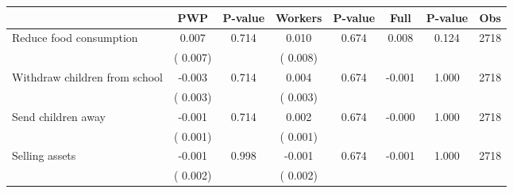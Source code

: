 
\begin{tabular}{l*{7}{c}}\hline&\multicolumn{1}{c}{PWP}&\multicolumn{1}{c}{P-value}&\multicolumn{1}{c}{Workers}&\multicolumn{1}{c}{P-value}&\multicolumn{1}{c}{Full}&\multicolumn{1}{c}{P-value}&\multicolumn{1}{c}{Obs} \\ \hline

 Reduce food consumption       &              0.007       &        0.714  &              0.010       &        0.674  &              0.008       &              0.124 &  2718 \\ 
                       &       (       0.007)             &                               &       (       0.008)                     &                               &                                               &                                &                      \\ 

 Withdraw children from school       &             -0.003       &        0.714  &              0.004       &        0.674  &             -0.001       &              1.000 &  2718 \\ 
                       &       (       0.003)             &                               &       (       0.003)                     &                               &                                               &                                &                      \\ 

 Send children away       &             -0.001       &        0.714  &              0.002       &        0.674  &             -0.000       &              1.000 &  2718 \\ 
                       &       (       0.001)             &                               &       (       0.001)                     &                               &                                               &                                &                      \\ 

 Selling assets       &             -0.001       &        0.998  &             -0.001       &        0.674  &             -0.001       &              1.000 &  2718 \\ 
                       &       (       0.002)             &                               &       (       0.002)                     &                               &                                               &                                &                      \\ 


\end{tabular}
